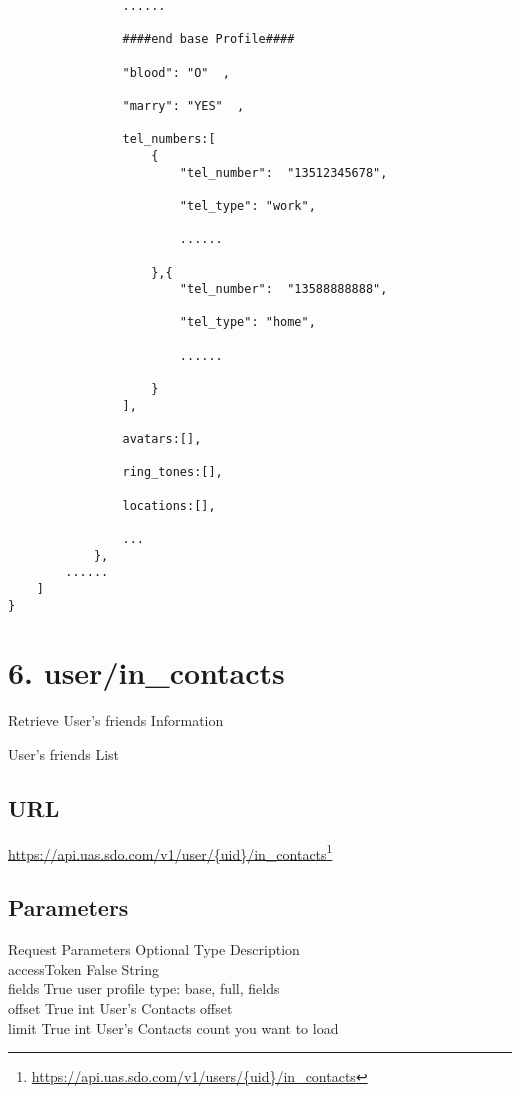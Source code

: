 \begin{verbatim}
                ......

                ####end base Profile####

                "blood": "O"  ,

                "marry": "YES"  ,

                tel_numbers:[
                    {
                        "tel_number":  "13512345678",

                        "tel_type": "work",

                        ......

                    },{
                        "tel_number":  "13588888888",

                        "tel_type": "home",

                        ......

                    }
                ],

                avatars:[],

                ring_tones:[],

                locations:[],

                ...
            },
        ......
    ]
}
\end{verbatim}


\chapter{6. user\slash in\_contacts}
\label{userin_contacts}

Retrieve User's friends Information

User's friends List

\section{URL}
\label{url}

\href{https://api.uas.sdo.com/v1/users/{uid}/in_contacts}{https:/\slash api.uas.sdo.com\slash v1\slash user\slash \{uid\}\slash in\_contacts}\footnote{\href{https://api.uas.sdo.com/v1/users/{uid}/in_contacts}{https:/\slash api.uas.sdo.com\slash v1\slash users\slash \{uid\}\slash in\_contacts}}

\section{Parameters}
\label{parameters}

Request Parameters \textbar{} Optional \textbar{} Type \textbar{} Description\\
accessToken \textbar{} False \textbar{} String\textbar{}\\
fields \textbar{} True \textbar{} user profile type: base, full, fields\\
offset \textbar{} True \textbar{} int \textbar{} User's Contacts offset\\
limit \textbar{} True \textbar{} int \textbar{} User's Contacts count you want to load 

